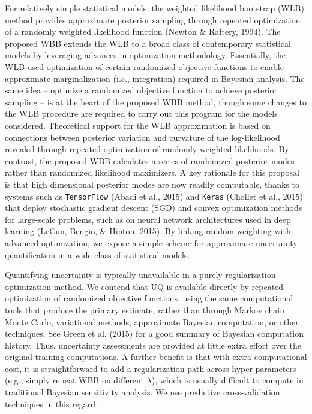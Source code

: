 \documentclass[12pt]{TD-CJS}
\begin{document}
For relatively simple statistical models, the weighted likelihood bootstrap (WLB) method provides
approximate posterior sampling through repeated optimization of a randomly weighted likelihood function (Newton \& Raftery, 1994).
The proposed WBB extends the WLB to a broad class of  contemporary statistical models by leveraging advances in optimization methodology.
Essentially, the WLB used optimization of certain 
randomized objective functions to enable approximate marginalization (i.e., integration) 
required in Bayesian analysis.  The same idea -- optimize a randomized objective function to 
achieve  posterior sampling -- is at the heart of the proposed WBB method, though some changes to the WLB procedure are required to 
carry out this program for the models considered.
Theoretical support for the WLB approximation is based on  connections between posterior variation and curvature of 
the log-likelihood revealed through repeated optimization of randomly weighted likelihoods. 
 By contrast, the proposed WBB calculates a series of
randomized  posterior modes rather than randomized likelihood maximizers. A key rationale for this proposal is  that 
high dimensional posterior modes are now readily computable, thanks to systems such as \verb+TensorFlow+ 
(Abadi et al., 2015) and 
\verb+Keras+ (Chollet et al., 2015)
that deploy stochastic gradient descent (SGD) and convex optimization methods for large-scale
problems, such as on neural network architectures used in deep learning (LeCun, Bengio, \& Hinton,  2015).
By linking random weighting with advanced optimization, we expose a simple scheme
for approximate uncertainty quantification in a wide class of statistical models.

Quantifying uncertainty is typically unavailable in a purely regularization optimization method. 
We contend that UQ is available directly by repeated optimization of randomized objective functions, using the same
computational tools that produce the primary estimate,  rather than through Markov
chain Monte Carlo, variational methods,  approximate Bayesian computation, or other techniques. See Green et al. (2015) for a good summary of Bayesian computation history. Thus, uncertainty assessments are provided at little extra effort over the original
training computations.  A further benefit is that with extra computational cost, it is straightforward to add a regularization path 
across hyper-parameters (e.g., simply repeat WBB on different $\lambda$), which is usually difficult to compute in traditional Bayesian
sensitivity analysis.  We use predictive cross-validation techniques in this regard.
\end{document}
